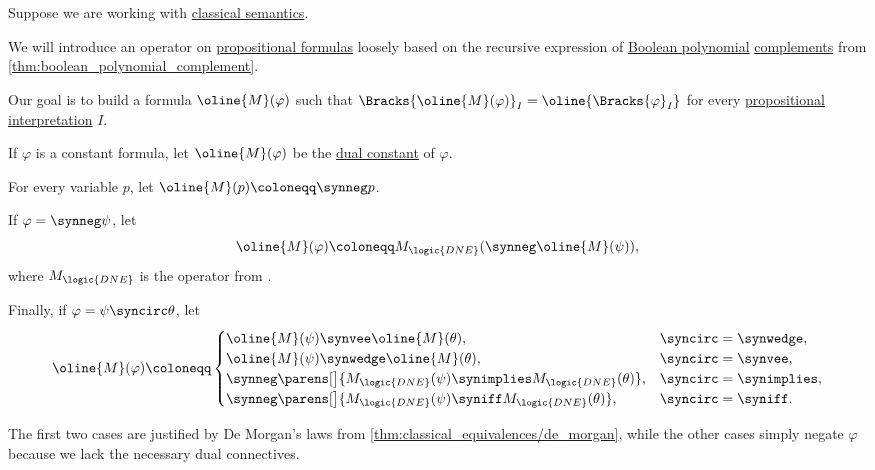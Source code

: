 \begin{algorithm}\label{alg:propositional_formula_dualization}
  Suppose we are working with \hyperref[def:truth_value_algebra/classical]{classical semantics}.

  We will introduce an operator on \hyperref[def:propositional_formula]{propositional formulas} loosely based on the recursive expression of \hyperref[def:free_boolean_algebra/polynomial]{Boolean polynomial} \hyperref[def:bounded_lattice_complement]{complements} from \cref{thm:boolean_polynomial_complement}.

  Our goal is to build a formula \( \oline{M}(\varphi) \) such that \( \Bracks{\oline{M}(\varphi)}_I = \oline{\Bracks{\varphi}_I} \) for every \hyperref[def:propositional_interpretation]{propositional interpretation} \( I \).

  \begin{thmenum}
     If \( \varphi \) is a constant formula, let \( \oline{M}(\varphi) \) be the \hyperref[def:bounded_lattice/opposite]{dual constant} of \( \varphi \).

     For every variable \( p \), let \( \oline{M}(p) \coloneqq \synneg p \).

     If \( \varphi = \synneg \psi \), let
    \begin{equation*}
      \oline{M}(\varphi) \coloneqq M_{\logic{DNE}}(\synneg \oline{M}(\psi)),
    \end{equation*}
    where \( M_{\logic{DNE}} \) is the operator from .

     Finally, if \( \varphi = \psi \syncirc \theta \), let
    \begin{equation*}
      \oline{M}(\varphi) \coloneqq \begin{cases}
        \oline{M}(\psi) \synvee \oline{M}(\theta),                                          &{\syncirc} = {\synwedge}, \\
        \oline{M}(\psi) \synwedge \oline{M}(\theta),                                        &{\syncirc} = {\synvee}, \\
        \synneg \parens[\big]{ M_{\logic{DNE}}(\psi) \synimplies M_{\logic{DNE}}(\theta) }, &{\syncirc} = {\synimplies}, \\
        \synneg \parens[\big]{ M_{\logic{DNE}}(\psi) \syniff M_{\logic{DNE}}(\theta) },     &{\syncirc} = {\syniff}.
      \end{cases}
    \end{equation*}

    The first two cases are justified by De Morgan's laws from \cref{thm:classical_equivalences/de_morgan}, while the other cases simply negate \( \varphi \) because we lack the necessary dual connectives.
  \end{thmenum}
\end{algorithm}

